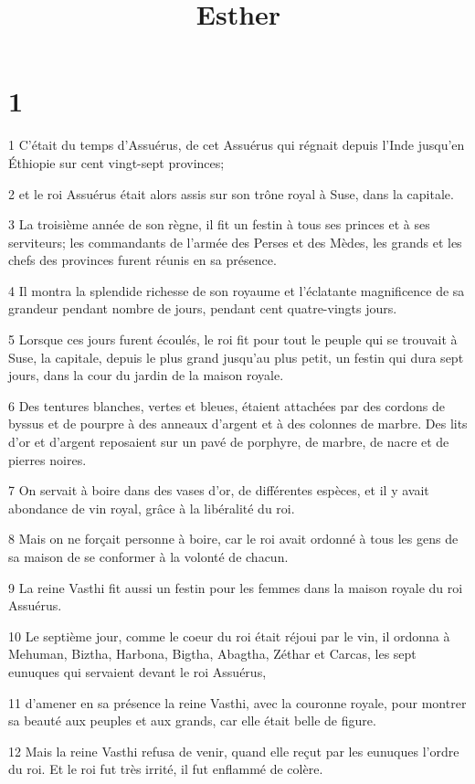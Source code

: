 

\title{Esther}


\chapter{1}

\par 1 C'était du temps d'Assuérus, de cet Assuérus qui régnait depuis l'Inde jusqu'en Éthiopie sur cent vingt-sept provinces;
\par 2 et le roi Assuérus était alors assis sur son trône royal à Suse, dans la capitale.
\par 3 La troisième année de son règne, il fit un festin à tous ses princes et à ses serviteurs; les commandants de l'armée des Perses et des Mèdes, les grands et les chefs des provinces furent réunis en sa présence.
\par 4 Il montra la splendide richesse de son royaume et l'éclatante magnificence de sa grandeur pendant nombre de jours, pendant cent quatre-vingts jours.
\par 5 Lorsque ces jours furent écoulés, le roi fit pour tout le peuple qui se trouvait à Suse, la capitale, depuis le plus grand jusqu'au plus petit, un festin qui dura sept jours, dans la cour du jardin de la maison royale.
\par 6 Des tentures blanches, vertes et bleues, étaient attachées par des cordons de byssus et de pourpre à des anneaux d'argent et à des colonnes de marbre. Des lits d'or et d'argent reposaient sur un pavé de porphyre, de marbre, de nacre et de pierres noires.
\par 7 On servait à boire dans des vases d'or, de différentes espèces, et il y avait abondance de vin royal, grâce à la libéralité du roi.
\par 8 Mais on ne forçait personne à boire, car le roi avait ordonné à tous les gens de sa maison de se conformer à la volonté de chacun.
\par 9 La reine Vasthi fit aussi un festin pour les femmes dans la maison royale du roi Assuérus.
\par 10 Le septième jour, comme le coeur du roi était réjoui par le vin, il ordonna à Mehuman, Biztha, Harbona, Bigtha, Abagtha, Zéthar et Carcas, les sept eunuques qui servaient devant le roi Assuérus,
\par 11 d'amener en sa présence la reine Vasthi, avec la couronne royale, pour montrer sa beauté aux peuples et aux grands, car elle était belle de figure.
\par 12 Mais la reine Vasthi refusa de venir, quand elle reçut par les eunuques l'ordre du roi. Et le roi fut très irrité, il fut enflammé de colère.
